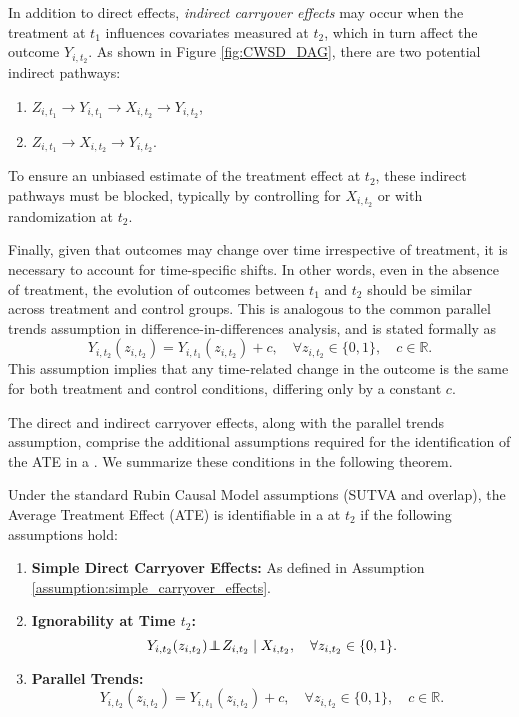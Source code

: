 In addition to direct effects, \emph{indirect carryover effects} may occur when the treatment at \(t_1\) influences covariates measured at \(t_2\), which in turn affect the outcome \(Y_{i,t_2}\). As shown in Figure \ref{fig:CWSD_DAG}, there are two potential indirect pathways:
\begin{enumerate}[label=(\arabic*), leftmargin=*]
    \item \(Z_{i,t_1} \to Y_{i,t_1} \to X_{i,t_2} \to Y_{i,t_2}\),
    \item \(Z_{i,t_1} \to X_{i,t_2} \to Y_{i,t_2}\).
\end{enumerate}
To ensure an unbiased estimate of the treatment effect at \(t_2\), these indirect pathways must be blocked, typically by controlling for \(X_{i,t_2}\) or with randomization at $t_2$. 

Finally, given that outcomes may change over time irrespective of treatment, it is necessary to account for time-specific shifts. In other words, even in the absence of treatment, the evolution of outcomes between \(t_1\) and \(t_2\) should be similar across treatment and control groups. This is analogous to the common parallel trends assumption in difference-in-differences analysis, and is stated formally as
\[
Y_{i,t_2}(z_{i,t_2}) = Y_{i,t_1}(z_{i,t_2}) + c, \quad \forall z_{i,t_2} \in \{0,1\}, \quad c \in \mathbb{R}.
\]
This assumption implies that any time-related change in the outcome is the same for both treatment and control conditions, differing only by a constant \(c\).

The direct and indirect carryover effects, along with the parallel trends assumption, comprise the additional assumptions required for the identification of the ATE in a \cwsd{}. We summarize these conditions in the following theorem.

\begin{theorem}
\label{theorem: identify_cwsd}
Under the standard Rubin Causal Model assumptions (SUTVA and overlap), the Average Treatment Effect (ATE) is identifiable in a \cwsd{} at $t_2$ if the following assumptions hold:
\begin{enumerate}
    \item \textbf{Simple Direct Carryover Effects:} As defined in Assumption \ref{assumption:simple_carryover_effects}.
    \item \textbf{Ignorability at Time \(t_2\):} 
    \[
    Y_{i,t_2}(z_{i,t_2}) \hspace{-.2em}\perp\!\!\!\!\perp\hspace{-.2em} Z_{i,t_2} \mid X_{i,t_2}, \quad \forall z_{i,t_2} \in \{0,1\}.
    \]
    \item \textbf{Parallel Trends:} 
    \[
    Y_{i,t_2}(z_{i,t_2}) = Y_{i,t_1}(z_{i,t_2}) + c, \quad \forall z_{i,t_2} \in \{0,1\}, \quad c \in \mathbb{R}.
    \]
\end{enumerate}
\end{theorem}

